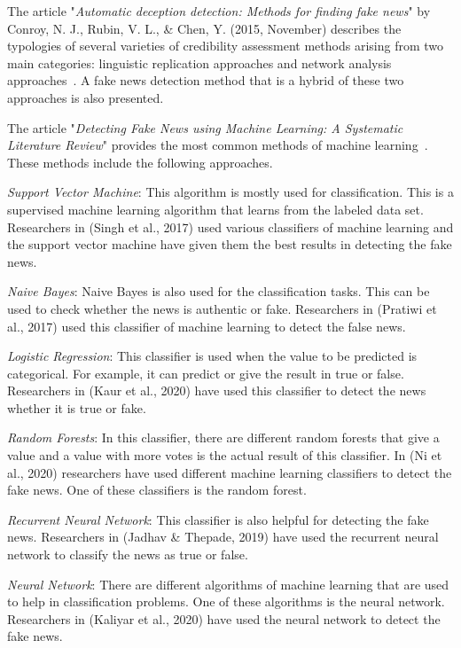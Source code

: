 The article "\textit{Automatic deception detection: Methods for finding fake news}" by Conroy, N. J., Rubin, V. L., \& Chen, Y. (2015, November) describes the typologies of several varieties of credibility assessment methods arising from two main categories: linguistic replication approaches and network analysis approaches~\cite{4}.
A fake news detection method that is a hybrid of these two approaches is also presented.

The article "\textit{Detecting Fake News using Machine Learning: A Systematic Literature Review}" provides the most common methods of machine learning~\cite{8}.
These methods include the following approaches.

\textit{Support Vector Machine}: This algorithm is mostly used for classification.
This is a supervised  machine learning algorithm that learns from the labeled data set.
Researchers in (Singh et al., 2017) used various classifiers of machine learning and the support vector machine have given them the best results in detecting the fake news.

\textit{Naive Bayes}: Naive Bayes is also used for the classification tasks.
This can be used to check whether the news is authentic or fake.
Researchers in (Pratiwi et al., 2017) used this classifier of machine learning to detect the false news.

\textit{Logistic Regression}: This classifier is used when the value to be predicted is categorical.
For example, it can predict or give the result in true or false.
Researchers in (Kaur et al., 2020) have used this classifier to detect the news whether it is true or fake.

\textit{Random Forests}: In this classifier, there are different random forests that give a value and a value with more votes is the actual result of this classifier.
In (Ni et al., 2020) researchers have used different machine learning classifiers to detect the fake news.
One of these classifiers is the random forest.

\textit{Recurrent Neural Network}: This classifier is also helpful for detecting the fake news.
Researchers in (Jadhav \& Thepade, 2019) have used the recurrent neural network to classify the news as true or false.

\textit{Neural Network}: There are different algorithms of machine learning that are used to help in classification problems.
One of these algorithms is the neural network.
Researchers in (Kaliyar et al., 2020) have used the neural network to detect the fake news.

